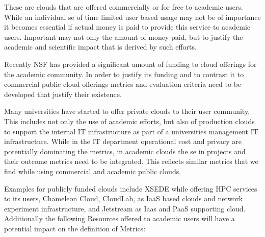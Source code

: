 \documentclass{sig-alternate-05-2015}
\begin{document}
\begin{description}
\setlength\itemsep{-2pt}

\item[\it Commercial public clouds.] These are clouds that are offered commercially or for free to academic users. While an individual se of time limited user based usage may not be of importance it becomes essential if actual money is paid to provide this service to academic users. Important may not only the amount of money paid, but to justify the academic and scientific impact \cite{las2015cluster,las2015xsede} that is derived by such efforts.

\item[\it Academic public clouds.] Recently NSF has provided a significant amount of funding to cloud offerings for the academic community. In order to justify its funding and to contrast it to commercial public cloud offerings metrics and evaluation criteria need to be developed that justify their existence.

\item[\it Academic private clouds.] Many universities have started to offer private clouds to their user community, This includes not only the use of academic efforts, but also of production clouds to support the internal IT infrastructure as part of a universities management IT infrastructure. While in the IT department operational cost and privacy are potentially dominating the metrics, in academic clouds the se in projects and their outcome metrics need to be integrated. This reflects similar metrics that we find while using commercial and academic public clouds.

\end{description}

Examples for publicly funded clouds include XSEDE while offering HPC services to its users, Chameleon Cloud, CloudLab, as IaaS based clouds and network experiment infrastructure, and Jetstream as Iaas and PaaS supporting cloud. Additionally the following Resources offered to academic users will have a potential impact on the definition of Metrics:
\end{document}

